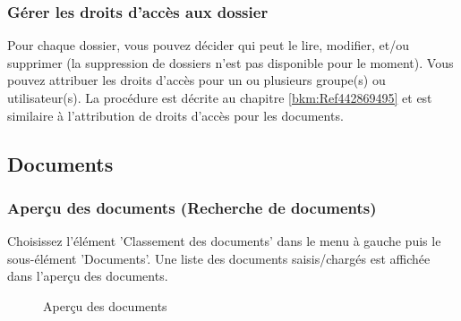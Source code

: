 \vspace{5cm}

\subsubsection{Gérer les droits d'accès aux dossier}
\label{bkm:Ref442273510}
Pour chaque dossier, vous pouvez décider qui peut le lire, modifier, et/ou supprimer (la suppression de dossiers n'est pas disponible pour le moment). Vous pouvez attribuer les droits d'accès pour un ou plusieurs groupe(s) ou utilisateur(s). La procédure est décrite au chapitre \ref{bkm:Ref442869495} et est similaire à l'attribution de droits d'accès pour les documents.

\pagebreak
\subsection{Documents}
\label{bkm:Ref442273482}

\subsubsection{Aperçu des documents (Recherche de documents)}
\label{bkm:Ref443047823}

Choisissez l'élément 'Classement des documents' dans le menu à gauche puis le sous-élément 'Documents'. Une liste des documents saisis/chargés est affichée dans l'aperçu des documents.

\begin{figure}[H]
\caption{Aperçu des documents}
\end{figure}

